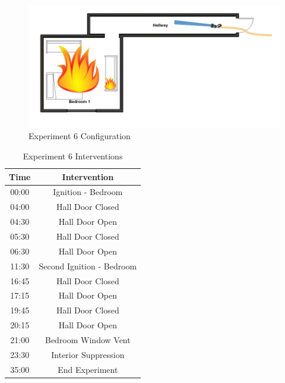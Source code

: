 \documentclass[12pt,oneside]{book}
\begin{document}
\begin{figure}[H]
	\centering
	\includegraphics[width=5in]{Howard_Exp_6.png}
	\caption{Experiment 6 Configuration}
	\label{fig:Exp6Config}
\end{figure}

\begin{table}[H]
	\centering
	\caption{Experiment 6 Interventions}
	\begin{tabular}{|c|c|} 
		\hline
		Time & Intervention \\ \hline \hline
		00:00 & Ignition - Bedroom \\ \hline
		04:00 & Hall Door Closed \\ \hline
		04:30 & Hall Door Open \\ \hline
		05:30 & Hall Door Closed \\ \hline
		06:30 & Hall Door Open \\ \hline
		11:30 & Second Ignition - Bedroom \\ \hline
		16:45 & Hall Door Closed \\ \hline
		17:15 & Hall Door Open \\ \hline
		19:45 & Hall Door Closed \\ \hline
		20:15 & Hall Door Open \\ \hline
		21:00 & Bedroom Window Vent \\ \hline
		23:30 & Interior Suppression \\ \hline
		35:00 & End Experiment\\ \hline
	\end{tabular}
	\label{Table:Exp6Interventions}
\end{table}

\clearpage
\end{document}
